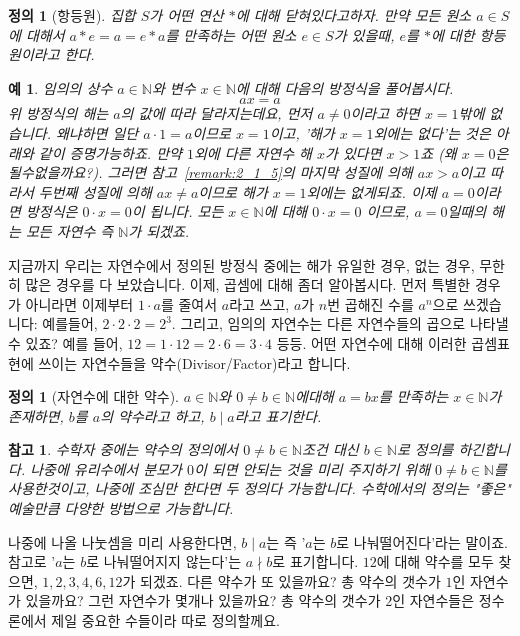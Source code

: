\documentclass[a4paper, 11pt]{report}
\renewcommand{\<}{\langle}
\renewcommand{\>}{\rangle}
\newtheorem{dfn}[thm]{정의}
\newtheorem{example}[thm]{예}
\newtheorem{remark}[thm]{참고}
\begin{document}
\begin{dfn}[항등원] 집합 $S$가 어떤 연산 $*$에 대해 닫혀있다고하자. 만약 모든 원소 $a \in S$에 대해서
  $a*e = a = e*a$를 만족하는 어떤 원소 $e \in S$가 있을때, $e$를 $*$에 대한 항등원이라고 한다.
\end{dfn}
\fi

\begin{example}
임의의 상수 $a \in \mathbb{N}$와 변수 $x \in \mathbb{N}$에 대해 다음의 방정식을 풀어봅시다.
$$
ax = a
$$
위 방정식의 해는 $a$의 값에 따라 달라지는데요, 먼저 $a \neq 0$이라고 하면 $x = 1$밖에 없습니다. 왜냐하면
일단 $a \cdot 1 = a$이므로 $x = 1$이고, '해가 $x = 1$외에는 없다'는 것은 아래와 같이 증명가능하죠.
만약 $1$외에 다른 자연수 해 $x$가 있다면 $x > 1$죠 (왜 $x = 0$은 될수없을까요?). 
그러면 참고~\ref{remark:2_1_5}의 마지막 성질에 의해
$ax > a$이고 따라서 두번째 성질에 의해 $ax \neq a$이므로 해가 $x = 1$외에는 없게되죠.
이제 $a = 0$이라면 방정식은 $0 \cdot x = 0$이 됩니다. 모든 $x \in \mathbb{N}$에 대해 $0 \cdot x = 0$
이므로, $a = 0$일때의 해는 모든 자연수 즉 $\mathbb{N}$가 되겠죠.
\end{example}

지금까지 우리는 자연수에서 정의된 방정식 중에는 해가 유일한 경우, 없는 경우, 무한히 많은 경우를 다 보았습니다.
이제, 곱셈에 대해 좀더 알아봅시다. 먼저 특별한 경우가 아니라면 이제부터 $1\cdot a$를 줄여서 
$a$라고 쓰고, $a$가 $n$번 곱해진 수를 $a^n$으로 쓰겠습니다: 예를들어, $2\cdot2 \cdot 2 = 2^3$.
그리고, 임의의 자연수는 다른 자연수들의 곱으로 나타낼 수 있죠? 예를 들어,
$12 = 1\cdot12 = 2\cdot6 = 3\cdot 4$ 등등. 어떤 자연수에 대해 이러한 곱셈표현에 쓰이는 자연수들을 
약수(Divisor/Factor)라고 합니다.

\begin{dfn}[자연수에 대한 약수]
  $a \in \mathbb{N}$와 $0 \neq b \in \mathbb{N}$에대해 $a = bx$를 만족하는 $x \in \mathbb{N}$가 존재하면, 
  $b$를 $a$의 약수라고 하고, $b \mid a$라고 표기한다.
\end{dfn}

\begin{remark}
  수학자 중에는 약수의 정의에서 $0 \neq b \in \mathbb{N}$조건 대신 $b \in \mathbb{N}$로 정의를 하긴합니다. 
  나중에 유리수에서 분모가 $0$이 되면 안되는 것을 미리 주지하기 위해 $0 \neq b \in \mathbb{N}$를 사용한것이고,
  나중에 조심만 한다면 두 정의다 가능합니다. 수학에서의 정의는 "좋은" 예술만큼 다양한 방법으로 가능합니다.
\end{remark}

나중에 나올 나눗셈을 미리 사용한다면, $b \mid a$는 즉 '$a$는 $b$로 나눠떨어진다'라는 말이죠. 
참고로 '$a$는 $b$로 나눠떨어지지 않는다'는 $a \nmid b$로 표기합니다. $12$에
대해 약수를 모두 찾으면, $1, 2, 3, 4, 6, 12$가 되겠죠. 다른 약수가 또 있을까요? 총 약수의 갯수가 $1$인 자연수가
있을까요? 그런 자연수가 몇개나 있을까요? 총 약수의 갯수가 $2$인 자연수들은 정수론에서 제일 중요한 수들이라 따로
정의할께요.
\end{document}
